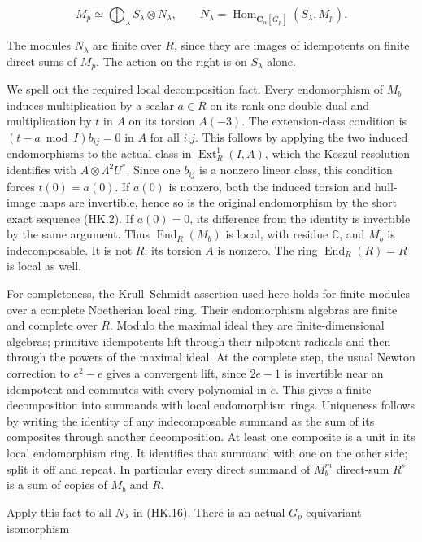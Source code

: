 \[
 M_p\simeq\bigoplus_\lambda S_\lambda\otimes N_\lambda,
 \qquad N_\lambda=\operatorname{Hom}_{\mathbf C_\alpha[G_p]}
                    (S_\lambda,M_p).
 \tag{HK.16}
\]

The modules \(N_\lambda\) are finite over \(R\), since they are images of
idempotents on finite direct sums of \(M_p\). The action on the right
is on \(S_\lambda\) alone.

We spell out the required local decomposition fact. Every
endomorphism of \(M_b\) induces multiplication by a scalar \(a\in R\) on
its rank-one double dual and multiplication by \(t\) in \(A\) on its torsion
\(A(-3)\). The extension-class condition is
\((t-a\bmod I)b_{ij}=0\) in \(A\) for all \(i\),\(j\). This follows by applying the
two induced endomorphisms to the actual class in \(\operatorname{Ext}^1_R(I,A)\),
which the Koszul resolution identifies with \(A\otimes\Lambda^2U^*\).
Since one \(b_{ij}\) is a nonzero linear class, this condition forces
\(t(0)=a(0)\). If \(a(0)\) is nonzero, both the induced torsion and hull-image
maps are invertible, hence so is the original endomorphism by the
short exact sequence (HK.2). If \(a(0)=0\), its difference from the
identity is invertible by the same argument. Thus \(\operatorname{End}_R(M_b)\) is
local, with residue \(\mathbb C\), and \(M_b\) is indecomposable. It is not \(R\):
its torsion \(A\) is nonzero. The ring \(\operatorname{End}_R(R)=R\) is local as well.

For completeness, the Krull--Schmidt assertion used here holds
for finite modules over a complete Noetherian local ring. Their
endomorphism algebras are finite and complete over \(R\). Modulo the
maximal ideal they are finite-dimensional algebras; primitive
idempotents lift through their nilpotent radicals and then through
the powers of the maximal ideal. At the complete step, the usual
Newton correction to \(e^2-e\) gives a convergent lift, since \(2e-1\) is
invertible near an idempotent and commutes with every polynomial
in \(e\). This gives a finite decomposition into summands with local
endomorphism rings. Uniqueness follows by writing the identity
of any indecomposable summand as the sum of its composites through
another decomposition. At least one composite is a unit in its
local endomorphism ring. It identifies that summand with one on
the other side; split it off and repeat. In particular every direct
summand of \(M_b^m\) direct-sum \(R^s\) is a sum of copies of \(M_b\) and \(R\).

Apply this fact to all \(N_\lambda\) in (HK.16). There is an actual
\(G_p\)-equivariant isomorphism

